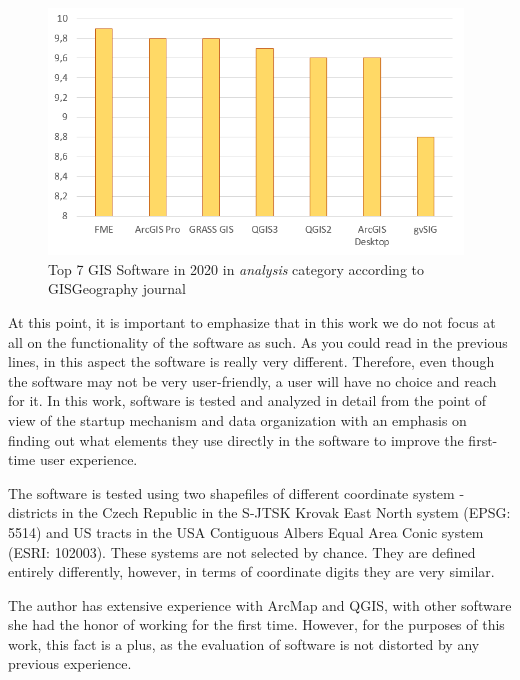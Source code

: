 \documentclass[a4paper,10pt,twoside]{article}
\begin{document}
\begin{figure}[hbt!] 
\begin{center}
\includegraphics[width=11cm]{../pictures/hodnoceni_analysis.png} 
\caption[Top 7 GIS Software in 2020 in \textit{analysis} category according to GISGeography journal]{Top 7 GIS Software in 2020 in \textit{analysis} category according to GISGeography journal}
\label{fig:hodnoceni_analysis}
\end{center}
\end{figure}

\noindent At this point, it is important to emphasize that in this work we do not focus at all on the functionality of the software as such. As you could read in the previous lines, in this aspect the software is really very different. Therefore, even though the software may not be very user-friendly, a user will have no choice and reach for it. In this work, software is tested and analyzed in detail from the point of view of the startup mechanism and data organization with an emphasis on finding out what elements they use directly in the software to improve the first-time user experience.

The software is tested using two shapefiles of different coordinate system - districts in the Czech Republic in the S-JTSK Krovak East North system (EPSG: 5514) and US tracts in the USA Contiguous Albers Equal Area Conic system (ESRI: 102003). These systems are not selected by chance. They are defined entirely differently, however, in terms of coordinate digits they are very similar.

The author has extensive experience with ArcMap and QGIS, with other software she had the honor of working for the first time. However, for the purposes of this work, this fact is a plus, as the evaluation of software is not distorted by any previous experience.

\newpage
\vspace*{-1cm}
\end{document}
